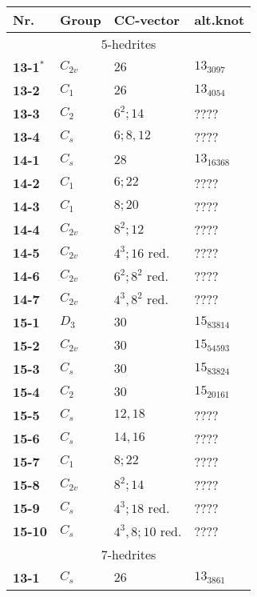 \documentclass[12pt]{article}
\begin{document}
\begin{table}
\begin{center}
{\scriptsize
\begin{minipage}{7cm}
\begin{tabular}{||l|l|l|l||}
\hline\hline
Nr.     &Group    &CC-vector      &alt.knot\\\hline\hline
\multicolumn{4}{||c||}{$5$-hedrites}\\\hline
{\bf 13-1${}^*$}&$C_{2v}$       &$26$           &$13_{3097}$\\
{\bf 13-2}      &$C_1$  &$26$           &$13_{4054}$\\
{\bf 13-3}      &$C_2$  &$6^2; 14$      &????\\
{\bf 13-4}      &$C_s$  &$6; 8, 12$     &????\\\hline
{\bf 14-1}      &$C_s$  &$28$           &$13_{16368}$\\
{\bf 14-2}      &$C_1$  &$6; 22$                &????\\
{\bf 14-3}      &$C_1$  &$8; 20$                &????\\
{\bf 14-4}      &$C_{2v}$       &$8^2; 12$      &????\\
{\bf 14-5}      &$C_{2v}$       &$4^3; 16$ red. &????\\
{\bf 14-6}      &$C_{2v}$       &$6^2; 8^2$ red.        &????\\
{\bf 14-7}      &$C_{2v}$       &$4^3, 8^2$ red.        &????\\\hline
{\bf 15-1}      &$D_3$  &$30$   &$15_{83814}$\\
{\bf 15-2}      &$C_{2v}$       &$30$   &$15_{54593}$\\
{\bf 15-3}      &$C_s$  &$30$   &$15_{83824}$\\
{\bf 15-4}      &$C_2$  &$30$   &$15_{20161}$\\
{\bf 15-5}      &$C_s$  &$12,18$        &????\\
{\bf 15-6}      &$C_s$  &$14,16$        &????\\
{\bf 15-7}      &$C_1$  &$8;22$ &????\\
{\bf 15-8}      &$C_{2v}$       &       $8^2;14$&????\\
{\bf 15-9}      &$C_s$  &$4^3; 18$ red. &????\\
{\bf 15-10}     &$C_s$  &$4^3, 8; 10$ red.      &????\\\hline
\hline
\multicolumn{4}{||c||}{$7$-hedrites}\\\hline
{\bf 13-1}      &$C_s$  &$26$           &$13_{3861}$\\

\end{tabular}
\end{minipage}}
\end{center}
\end{table}
\end{document}
